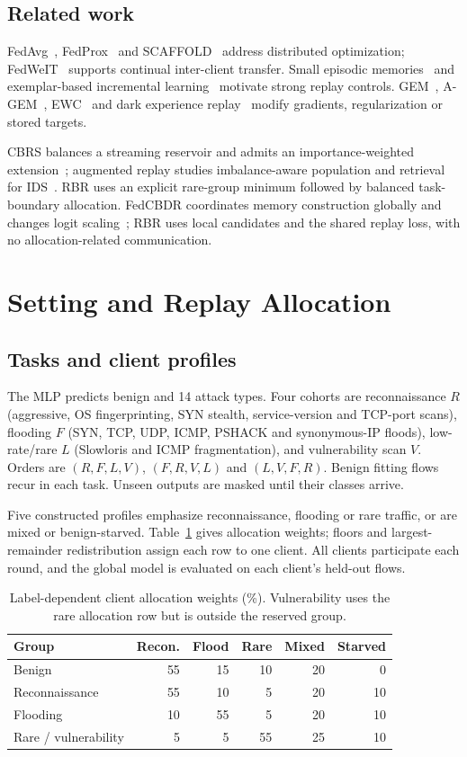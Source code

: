 \documentclass[journal,10pt]{IEEEtran}
\begin{document}
\subsection{Related work}
FedAvg~\cite{fedavg}, FedProx~\cite{fedprox} and SCAFFOLD~\cite{scaffold} address distributed optimization; FedWeIT~\cite{fedweit} supports continual inter-client transfer. Small episodic memories~\cite{tiny} and exemplar-based incremental learning~\cite{icarl} motivate strong replay controls. GEM~\cite{gem}, A-GEM~\cite{agem}, EWC~\cite{ewc} and dark experience replay~\cite{der} modify gradients, regularization or stored targets.

CBRS balances a streaming reservoir and admits an importance-weighted extension~\cite{cbrs}; augmented replay studies imbalance-aware population and retrieval for IDS~\cite{amr}. RBR uses an explicit rare-group minimum followed by balanced task-boundary allocation. FedCBDR coordinates memory construction globally and changes logit scaling~\cite{fedcbdr}; RBR uses local candidates and the shared replay loss, with no allocation-related communication.

\section{Setting and Replay Allocation}
\subsection{Tasks and client profiles}
The MLP predicts benign and 14 attack types. Four cohorts are reconnaissance $R$ (aggressive, OS fingerprinting, SYN stealth, service-version and TCP-port scans), flooding $F$ (SYN, TCP, UDP, ICMP, PSHACK and synonymous-IP floods), low-rate/rare $L$ (Slowloris and ICMP fragmentation), and vulnerability scan $V$. Orders are $(R,F,L,V)$, $(F,R,V,L)$ and $(L,V,F,R)$. Benign fitting flows recur in each task. Unseen outputs are masked until their classes arrive.

Five constructed profiles emphasize reconnaissance, flooding or rare traffic, or are mixed or benign-starved. Table~\ref{tab:allocation} gives allocation weights; floors and largest-remainder redistribution assign each row to one client. All clients participate each round, and the global model is evaluated on each client's held-out flows.
\begin{table}[t]
\centering
\caption{Label-dependent client allocation weights (\%). Vulnerability uses the rare allocation row but is outside the reserved group.}
\label{tab:allocation}
\footnotesize
\begin{tabular}{lrrrrr}
\toprule
Group & Recon. & Flood & Rare & Mixed & Starved\\
\midrule
Benign &55&15&10&20&0\\
Reconnaissance &55&10&5&20&10\\
Flooding &10&55&5&20&10\\
Rare / vulnerability &5&5&55&25&10\\
\bottomrule
\end{tabular}
\end{table}
\end{document}
